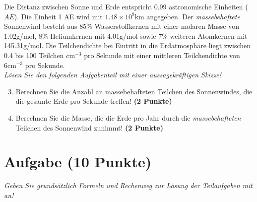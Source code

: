 \documentclass[a4paper, 9pt]{scrartcl}\usepackage[]{graphicx}\usepackage[]{xcolor}
\begin{document}
Die Distanz zwischen Sonne und Erde entspricht 0.99 astronomische Einheiten ($AE$). Die Einheit 1 AE wird mit \ensuremath{1.48\times 10^{8}}km angegeben. Der \textit{massebehaftete} Sonnenwind besteht aus 85\% Wasserstoffkernen mit einer molaren Masse von 1.02g/mol, 8\% Heliumkernen mit 4.01g/mol sowie 7\% weiteren Atomkernen mit  145.31g/mol. Die Teilchendichte bei Eintritt in die Erdatmosphäre liegt zwischen 0.4 bis 100 Teilchen cm$^{-3}$ pro Sekunde mit einer mittleren Teilchendichte von 6cm$^{-3}$ pro Sekunde. \\

\textit{Lösen Sie den folgenden Aufgabenteil mit einer aussagekräftigen Skizze!}

\begin{enumerate}
  \setcounter{enumi}{2}
\item Berechnen Sie die Anzahl an massebehafteten Teilchen des Sonnenwindes, die die gesamte Erde pro Sekunde treffen! \textbf{(2 Punkte)}
\item Berechnen Sie die Masse, die die Erde pro Jahr durch die \textit{massebehafteten} Teilchen des Sonnenwind zunimmt! \textbf{(2 Punkte)}
\end{enumerate}


\clearpage

\section{Aufgabe \hfill (10 Punkte)}

\textit{Geben Sie grundsätzlich Formeln und Rechenweg zur Lösung der Teilaufgaben mit an!} \\[1Ex]
 
\end{document}
